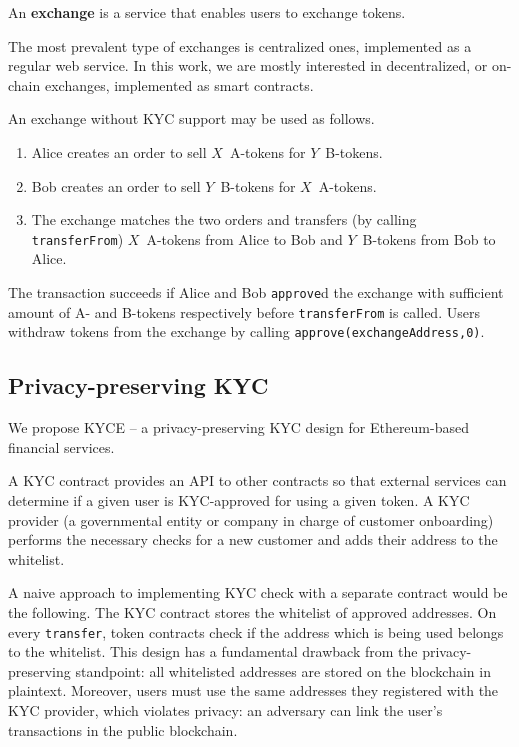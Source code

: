 \begin{definition}
	An \textbf{exchange} is a service that enables users to exchange tokens.
\end{definition}

The most prevalent type of exchanges is centralized ones, implemented as a regular web service.
In this work, we are mostly interested in decentralized, or on-chain exchanges, implemented as smart contracts. 

An exchange without KYC support may be used as follows.
\begin{enumerate}
	\item Alice creates an order to sell $X$~A-tokens for $Y$~B-tokens.
	\item Bob creates an order to sell $Y$~B-tokens for $X$~A-tokens.
	\item The exchange matches the two orders and transfers (by calling \texttt{transferFrom}) $X$~A-tokens from Alice to Bob and $Y$~B-tokens from Bob to Alice.
\end{enumerate}

The transaction succeeds if Alice and Bob \texttt{approve}d the exchange with sufficient amount of A- and B-tokens respectively before \texttt{transferFrom} is called.
Users withdraw tokens from the exchange by calling \texttt{approve(exchangeAddress,0)}.



\subsection{Privacy-preserving KYC}
\label{sec:PrivacyPreservingKYC}

We propose KYCE -- a privacy-preserving KYC design for Ethereum-based financial services.

A KYC contract provides an API to other contracts so that external services can determine if a given user is KYC-approved for using a given token.
A KYC provider (a governmental entity or company in charge of customer onboarding) performs the necessary checks for a new customer and adds their address to the whitelist.

A naive approach to implementing KYC check with a separate contract would be the following.
The KYC contract stores the whitelist of approved addresses.
On every \texttt{transfer}, token contracts check if the address which is being used belongs to the whitelist.
This design has a fundamental drawback from the privacy-preserving standpoint: all whitelisted addresses are stored on the blockchain in plaintext.
Moreover, users must use the same addresses they registered with the KYC provider, which violates privacy: an adversary can link the user's transactions in the public blockchain.


